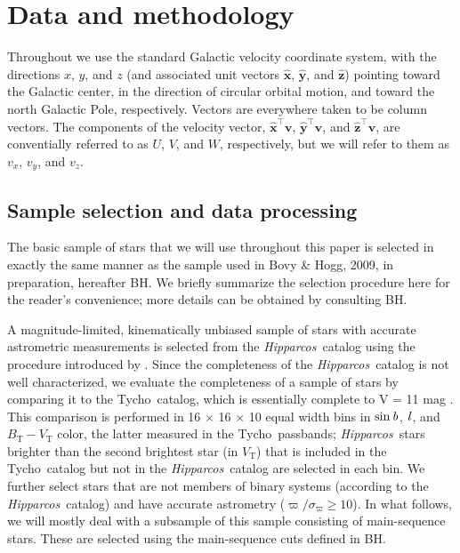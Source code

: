 \documentclass[12pt,preprint]{aastex}
\newcommand{\Hipparcos}{\textsl{Hipparcos}}
\newcommand{\Tycho}{Tycho}
\renewcommand{\vec}[1]{\mathbf{#1}} %
\newcommand{\vv}{\vec{v}}
\newcommand{\eex}{\vec{\hat{x}}}
\newcommand{\eey}{\vec{\hat{y}}}
\newcommand{\eez}{\vec{\hat{z}}}
\newcommand{\T}{^{\scriptscriptstyle \top}}   %
\newcommand{\gall}{{\it l}}
\newcommand{\galb}{{\it b}}
\newcommand{\vx}{\ensuremath{v_x}}
\newcommand{\vy}{\ensuremath{v_y}}
\newcommand{\vz}{\ensuremath{v_z}}
\newcommand{\bh}{BH}
\newcommand{\plx}{\ensuremath{\varpi}}
\newcommand{\eplx}{\ensuremath{\sigma_\varpi}}
\begin{document}
\section{Data and methodology}\label{sec:data}

Throughout we use the standard Galactic velocity coordinate system,
with the directions $x$, $y$, and $z$ (and associated unit vectors
$\eex$, $\eey$, and $\eez$) pointing toward the Galactic center, in
the direction of circular orbital motion, and toward the north
Galactic Pole, respectively. Vectors are everywhere taken to be column
vectors. The components of the velocity vector, $\eex\T\vv$,
$\eey\T\vv$, and $\eez\T\vv$, are conventially referred to as $U$,
$V$, and $W$, respectively, but we will refer to them as \vx, \vy, and
\vz.

\subsection{Sample selection and data processing}

The basic sample of stars that we will use throughout this paper is
selected in exactly the same manner as the sample used in Bovy \&
Hogg, 2009, in preparation, hereafter \bh. We briefly summarize the
selection procedure here for the reader's convenience; more details
can be obtained by consulting \bh.

A magnitude-limited, kinematically unbiased sample of stars with
accurate astrometric measurements is selected from the \Hipparcos\
catalog \citep{ESA97a,vanLeeuwen07a} using the procedure introduced by
\citet{Dehnen98a}. Since the completeness of the \Hipparcos\ catalog
is not well characterized, we evaluate the completeness of a sample of
stars by comparing it to the \Tycho\ catalog, which is essentially
complete to V = 11 mag \citep{hog00a,hog00b}. This comparison is
performed in 16 $\times$ 16 $\times$ 10 equal width bins in $\sin
\galb$, $\gall$, and $B_\mathrm{T} - V_\mathrm{T}$ color, the latter
measured in the \Tycho\ passbands; \Hipparcos\ stars brighter than the
second brightest star (in $V_\mathrm{T}$) that is included in the
\Tycho\ catalog but not in the \Hipparcos\ catalog are selected in
each bin. We further select stars that are not members of binary
systems (according to the \Hipparcos\ catalog) and have accurate
astrometry ($\plx/\eplx \geq 10$). In what follows, we will mostly
deal with a subsample of this sample consisting of main-sequence
stars. These are selected using the main-sequence cuts defined in \bh.
\end{document}
